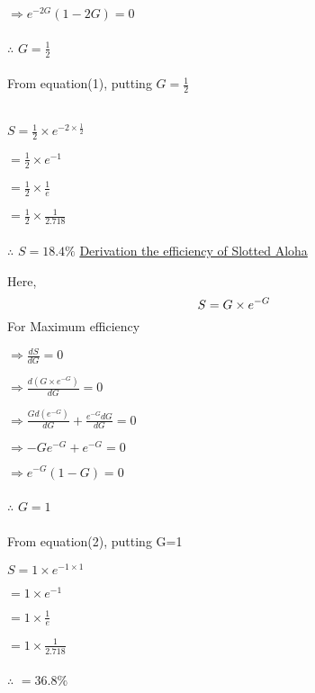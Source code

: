 \documentclass[12pt,a4paper]{article}
\begin{document}
\par $\Rightarrow e^{-2G}(1-2G)=0$\\\\
$\therefore$ $ G=\frac{1}{2}$\\\\
 From equation(1), putting $G=\frac{1}{2}$\\\\
\par $ S=\frac{1}{2}\times e^{-2\times \frac{1}{2}}$\\
\par $=\frac{1}{2} \times e^{-1}$\\
\par $=\frac{1}{2}\times \frac{1}{e}$\\
\par $=\frac{1}{2}\times \frac{1}{2.718}$\\\\
$\therefore$ $S=18.4\%$
\newpage
\underline{Derivation the efficiency of Slotted Aloha}\\
\par Here,\\
\begin{equation}
  S=G\times e^{-G}\\
\end{equation}
For Maximum efficiency \\
\vskip 4pt
\par $\Rightarrow \frac{dS}{dG}=0$\\ 
\par $\Rightarrow \frac{d(G\times e^{-G})}{dG}=0$\\
\par $\Rightarrow \frac{Gd(e^{-G})}{dG}+\frac{e^{-G}dG}{dG}=0$\\
\par $\Rightarrow -Ge^{-G}+e^{-G}=0$\\
\par $\Rightarrow e^{-G}(1-G)=0$\\\\
$\therefore$ $G=1$\\\\
From equation(2), putting G=1\\
\par $S=1\times e^{-1\times 1}$\\
\par $=1 \times e^{-1}$\\
\par $=1\times \frac{1}{e}$\\
\par $=1\times \frac{1}{2.718}$\\\\
$\therefore$ $=36.8\%$
\end{document}
